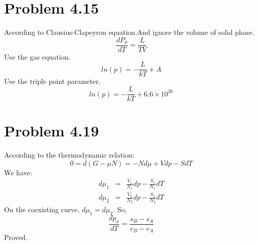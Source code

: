 \documentclass{article}
\begin{document}
\section*{Problem 4.15} %
\label{sec:problem_4_15}
	

	According to Clausius-Clapeyron equation.And ignore the volume of solid phase.
	$$\frac{dP_{\sigma}}{dT}=\frac{L}{TV}$$
	Use the gas equation.
	$$ln(p)=-\frac{L}{kT}+A$$
	Use the triple point parameter.
	$$ln(p)=-\frac{L}{kT}+6.6\times10^{26}$$
\section*{Problem 4.19}
According to the thermodynamic relation:
$$
0=d(G-\mu N)=-Nd\mu +Vdp-SdT  
$$
We have:
\begin{eqnarray*}
d\mu_1 &=& \frac{V_1}{N_1}dp-\frac{S_1}{N_1}dT  \\
d\mu_2 &=& \frac{V_2}{N_2}dp-\frac{S_2}{N_2}dT 
\end{eqnarray*}
On the coexisting curve, $d\mu_1=d\mu_2$. So,
$$\frac{dp_{\sigma}}{dT}=\frac{s_B-s_A}{v_B-v_A}$$
Proved.
\end{document}
